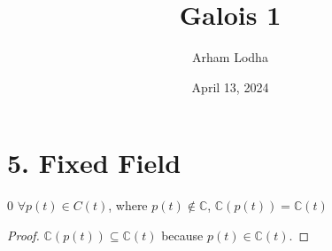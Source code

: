 \documentclass{article}
\newcommand{\C}{\mathbb{C}}
\begin{document}
\title{Galois 1}
\author{Arham Lodha}%
\date{April 13, 2024}%
\maketitle

\section*{5. Fixed Field}

\begin{claim}{0}\label{Claim 0.}
    $\forall p(t) \in C(t)$, where $p(t) \not \in \C$, $\C(p(t)) = \C(t)$    
\end{claim}
\begin{proof}
    $\C(p(t)) \subseteq \C(t)$ because $p(t) \in \C(t)$. 
    
    
\end{proof}
\end{document}
